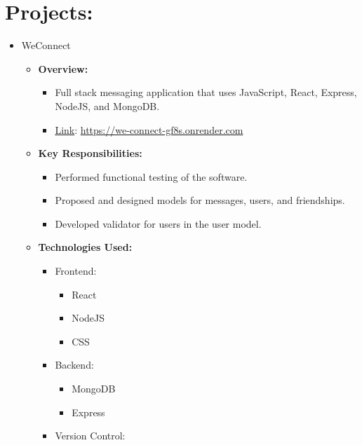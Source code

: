\documentclass[12pt, oneside, a4paper]{article}
\begin{document}
\section*{Projects:}
\begin{itemize}
    \scriptsize
    \item WeConnect
          \begin{itemize}
              \item \textbf{Overview:} 
               \begin{itemize}
                 \item Full stack messaging application that uses JavaScript, React, Express, NodeJS, and MongoDB.
                 \item \underline{Link}: \url{https://we-connect-gf8s.onrender.com}
               \end{itemize}
              \item \textbf{Key Responsibilities:}
                \begin{itemize}
                    \item Performed functional testing of the software.
                    \item Proposed and designed models for messages, users, and friendships.
                    \item Developed validator for users in the user model.
                \end{itemize}
              \item \textbf{Technologies Used:}
              \begin{itemize}
                \item Frontend:
                    \begin{itemize}
                        \item React
                        \item NodeJS
                        \item CSS
                    \end{itemize}
                \item Backend:
                    \begin{itemize}
                        \item MongoDB
                        \item Express
                    \end{itemize}
                \item Version Control:
                    \begin{itemize}

\end{itemize}
\end{itemize}
\end{itemize}
\end{itemize}
\end{document}
